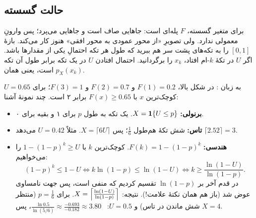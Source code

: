 \subsection{حالت گسسته}

برای متغیر گسسته، $F$ پله‌ای است: جاهایی صاف است و جاهایی می‌پرد؛ پس وارونِ معمولی ندارد. ولی تصویرِ «از محور عمودی به محور افقی» هنوز کار می‌کند. بازهٔ $[0,1]$ را به تکه‌های پشت سر هم ببرید که طول هر تکه احتمالِ یکی از مقدارها باشد. اگر $U$ در تکهٔ $k$-ام افتاد، $x_k$ را برگردانید. احتمال افتادن $U$ در یک تکه برابر طول آن تکه است، یعنی همان $p_X(x_k)$.

\begin{figblock}

\end{figblock}

به زبان :  در شکل بالا، $F(1)=0.2$ و $F(2)=0.7$ و $F(3)=1$؛ برای $U=0.65$ کوچک‌ترین $x$ با $F(x)\ge0.65$ برابر ۲ است. چند نمونهٔ آشنا:
\begin{itemize}
  \item \textbf{برنولی:} $X=\mathbf{1}\{U\le p\}$. یک تکه به طول $p$ برای ۱ و بقیه برای ۰.
  \item \textbf{تاس:} شش تکهٔ هم‌طول $\frac16$؛ پس $X=\lceil6U\rceil$. مثلاً $U=0.42$ می‌دهد $\lceil2.52\rceil=3$.
  \item \textbf{هندسی:} $F(k)=1-(1-p)^k$. کوچک‌ترین $k$ با $1-(1-p)^k\ge U$ را می‌خواهیم:
  \[ (1-p)^k\le1-U\iff k\ln(1-p)\le\ln(1-U)\iff k\ge\frac{\ln(1-U)}{\ln(1-p)}. \]
  در قدم آخر بر $\ln(1-p)$ تقسیم کردیم که منفی است، پس جهت نامساوی عوض شد (باز هم همان نکتهٔ علامت!). نتیجه: $X=\Bigl\lceil\frac{\ln(1-U)}{\ln(1-p)}\Bigr\rceil$. برای $p=\frac16$ (منتظر شش ماندن در تاس) و $U=0.5$: \ $\frac{\ln0.5}{\ln(5/6)}\approx\frac{-0.693}{-0.182}\approx3.80$، پس $X=4$.
\end{itemize}

